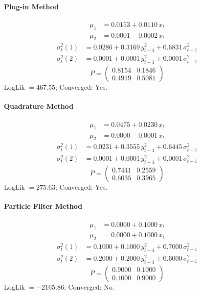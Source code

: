 \documentclass[11pt, a4paper]{article}
\begin{document}
\paragraph{Plug-in Method}
\begin{align}
\mu_{1} &= 0.0153 + 0.0110\, x_t \\
\mu_{2} &= 0.0001 -0.0002\, x_t
\end{align}
\begin{align}
\sigma^2_{t}(1) &= 0.0286 + 0.3169\, y_{t-1}^2 + 0.6831\, \sigma^2_{t-1} \\
\sigma^2_{t}(2) &= 0.0001 + 0.0001\, y_{t-1}^2 + 0.0001\, \sigma^2_{t-1}
\end{align}
\begin{equation}
P = \begin{pmatrix} 0.8154 & 0.1846 \\ 0.4919 & 0.5081 \end{pmatrix}
\end{equation}
LogLik $= 467.55$; Converged: Yes.

\paragraph{Quadrature Method}
\begin{align}
\mu_{1} &= 0.0475 + 0.0230\, x_t \\
\mu_{2} &= 0.0000 -0.0001\, x_t
\end{align}
\begin{align}
\sigma^2_{t}(1) &= 0.0231 + 0.3555\, y_{t-1}^2 + 0.6445\, \sigma^2_{t-1} \\
\sigma^2_{t}(2) &= 0.0001 + 0.0001\, y_{t-1}^2 + 0.0001\, \sigma^2_{t-1}
\end{align}
\begin{equation}
P = \begin{pmatrix} 0.7441 & 0.2559 \\ 0.6035 & 0.3965 \end{pmatrix}
\end{equation}
LogLik $= 275.63$; Converged: Yes.

\paragraph{Particle Filter Method}
\begin{align}
\mu_{1} &= 0.0000 + 0.1000\, x_t \\
\mu_{2} &= 0.0000 + 0.1000\, x_t
\end{align}
\begin{align}
\sigma^2_{t}(1) &= 0.1000 + 0.1000\, y_{t-1}^2 + 0.7000\, \sigma^2_{t-1} \\
\sigma^2_{t}(2) &= 0.2000 + 0.2000\, y_{t-1}^2 + 0.6000\, \sigma^2_{t-1}
\end{align}
\begin{equation}
P = \begin{pmatrix} 0.9000 & 0.1000 \\ 0.1000 & 0.9000 \end{pmatrix}
\end{equation}
LogLik $= -2165.86$; Converged: No.
\end{document}
